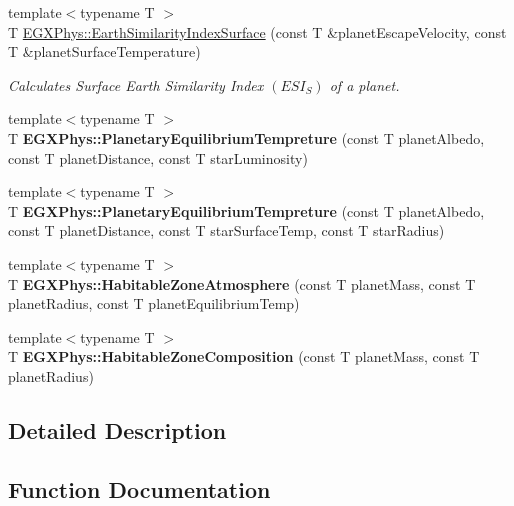 \begin{DoxyCompactItemize}
{\footnotesize template$<$typename T $>$ }\\T \mbox{\hyperlink{group___astrophysics_ga1df772b0ed354ca7f7e4a7a4af072325}{E\+G\+X\+Phys\+::\+Earth\+Similarity\+Index\+Surface}} (const T \&planet\+Escape\+Velocity, const T \&planet\+Surface\+Temperature)
\begin{DoxyCompactList}\small\item\em Calculates Surface Earth Similarity Index $(ESI_S)$ of a planet. \end{DoxyCompactList}\item 
\mbox{\label{group___astrophysics_gaeac3ced5104701ee02fc100f7cf4c189}} 
{\footnotesize template$<$typename T $>$ }\\T {\bfseries E\+G\+X\+Phys\+::\+Planetary\+Equilibrium\+Tempreture} (const T planet\+Albedo, const T planet\+Distance, const T star\+Luminosity)
\item 
\mbox{\label{group___astrophysics_ga099c12876fba6deb13ae2cf0e92644fe}} 
{\footnotesize template$<$typename T $>$ }\\T {\bfseries E\+G\+X\+Phys\+::\+Planetary\+Equilibrium\+Tempreture} (const T planet\+Albedo, const T planet\+Distance, const T star\+Surface\+Temp, const T star\+Radius)
\item 
\mbox{\label{group___astrophysics_ga0814237dccfe3c968b97fa6c93aeca27}} 
{\footnotesize template$<$typename T $>$ }\\T {\bfseries E\+G\+X\+Phys\+::\+Habitable\+Zone\+Atmosphere} (const T planet\+Mass, const T planet\+Radius, const T planet\+Equilibrium\+Temp)
\item 
\mbox{\label{group___astrophysics_ga14ab036f8c617512236522c8e31dd072}} 
{\footnotesize template$<$typename T $>$ }\\T {\bfseries E\+G\+X\+Phys\+::\+Habitable\+Zone\+Composition} (const T planet\+Mass, const T planet\+Radius)
\end{DoxyCompactItemize}


\subsection{Detailed Description}


\subsection{Function Documentation}
\mbox{\label{group___astrophysics_ga909f82edfaed449b44e94788b642ebb8}} 
